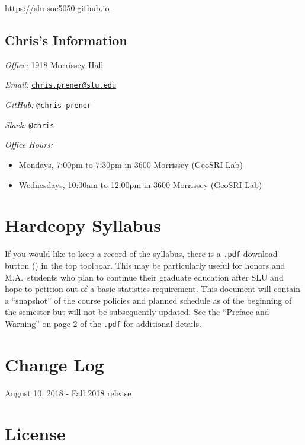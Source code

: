 \documentclass[]{book}
\theoremstyle{definition}
\theoremstyle{definition}
\theoremstyle{definition}
\theoremstyle{remark}
\begin{document}
\url{https://slu-soc5050.github.io}

\hypertarget{chriss-information}{%
\subsection*{Chris's Information}\label{chriss-information}}

\emph{Office:} 1918 Morrissey Hall

\emph{Email:}
\href{mailto:chris.prener@slu.edu}{\nolinkurl{chris.prener@slu.edu}}

\emph{GitHub:} \texttt{@chris-prener}

\emph{Slack:} \texttt{@chris}

\emph{Office Hours:}

\begin{itemize}
\item
  Mondays, 7:00pm to 7:30pm in 3600 Morrissey (GeoSRI Lab)
\item
  Wednesdays, 10:00am to 12:00pm in 3600 Morrissey (GeoSRI Lab)
\end{itemize}

\hypertarget{hardcopy-syllabus}{%
\section*{Hardcopy Syllabus}\label{hardcopy-syllabus}}

If you would like to keep a record of the syllabus, there is a
\texttt{.pdf} download button () in the top toolboar. This may be
particularly useful for honors and M.A.~students who plan to continue
their graduate education after SLU and hope to petition out of a basic
statistics requirement. This document will contain a ``snapshot'' of the
course policies and planned schedule as of the beginning of the semester
but will not be subsequently updated. See the ``Preface and Warning'' on
page 2 of the \texttt{.pdf} for additional details.

\hypertarget{change-log}{%
\section*{Change Log}\label{change-log}}

August 10, 2018 - Fall 2018 release

\hypertarget{license}{%
\section*{License}\label{license}}
\end{document}
